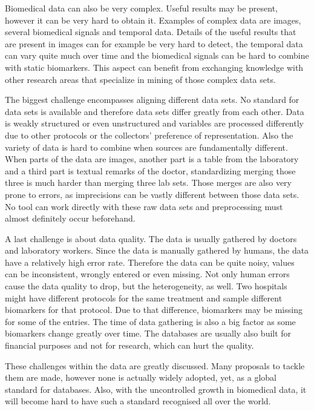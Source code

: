 \documentclass[10pt,a4paper]{article}
\begin{document}
	Biomedical data can also be very complex. Useful results may be present, however it can be very hard to obtain it. Examples of complex data are images, several biomedical signals and temporal data. Details of the useful results that are present in images can for example be very hard to detect, the temporal data can vary quite much over time and the biomedical signals can be hard to combine with static biomarkers. \cite{Yoo2012} This aspect can benefit from exchanging knowledge with other research areas that specialize in mining of those complex data sets. \cite{Turkay2014, bellazzi2011data}
	
	The biggest challenge encompasses aligning different data sets. No standard for data sets is available and therefore data sets differ greatly from each other. Data is weakly structured or even unstructured \cite{Holzinger2014} and variables are processed differently due to other protocols or the collectors' preference of representation.\cite{Otasek2014} Also the variety of data is hard to combine when sources are fundamentally different. When parts of the data are images, another part is a table from the laboratory and a third part is textual remarks of the doctor, standardizing merging those three is much harder than merging three lab sets. Those merges are also very prone to errors, as imprecisions can be vastly different between those data sets. No tool can work directly with these raw data sets and preprocessing must almost definitely occur beforehand.\cite{CIOS20021, Turkay2014}
	
	A last challenge is about data quality. The data is usually gathered by doctors and laboratory workers. Since the data is manually gathered by humans, the data have a relatively high error rate. Therefore the data can be quite noisy, values can be inconsistent, wrongly entered or even missing. \cite{CIOS20021} Not only human errors cause the data quality to drop, but the heterogeneity, as well. Two hospitals might have different protocols for the same treatment and sample different biomarkers for that protocol. Due to that difference, biomarkers may be missing for some of the entries. The time of data gathering is also a big factor as some biomarkers change greatly over time. The databases are usually also built for financial purposes and not for research, which can hurt the quality. \cite{Yoo2012}
	
	These challenges within the data are greatly discussed.\cite{bellazzi2011data} Many proposals to tackle them are made, however none is actually widely adopted, yet, as a global standard for databases. Also, with the uncontrolled growth in biomedical data, it will become hard to have such a standard recognised all over the world. \cite{Otasek2014, marenco2004qis, bichutskiy2006heterogeneous, sperzel1991biomedical, aubry1988design, Windridge2014}  
	
\end{document}
